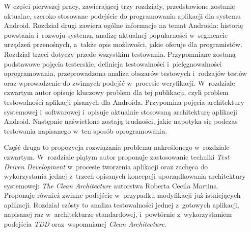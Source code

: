 W części pierwszej pracy, zawierającej trzy rozdziały, przedstawione zostanie aktualne, szeroko stosowane podejście do programowania aplikacji dla systemu Android. Rozdział drugi zawiera ogólne informacje na temat Androida: historię powstania i~rozwoju systemu, analizę aktualnej popularności w~segmencie urządzeń przenośnych, a~także opis możliwości, jakie oferuje dla programistów. Rozdział trzeci dotyczy przede wszystkim testowania. Przypomniane zostaną podstawowe pojęcia testerskie, definicja testowalności i~pielęgnowalności oprogramowania, przeprowadzona analiza obszarów testowych i~rodzajów testów oraz wprowadzenie do zwinnych podejść w~procesie weryfikacji. W~rozdziale czwartym autor opisuje kluczowy problem dla tej publikacji, czyli problem testowalności aplikacji pisanych dla Androida. Przypomina pojęcia architektury systemowej i~softwarowej i~opisuje aktualnie stosowaną architekturę aplikacji Android. Następnie naświetlone zostają trudności, jakie napotyka się podczas testowania napisanego w~ten sposób oprogramowania.

Część druga to propozycja rozwiązania problemu nakreślonego w~rozdziale czwartym. W~rozdziale piątym autor proponuje zastosowanie techniki \textit{Test Driven Development} w~procesie tworzenia aplikacji oraz zachęca do wykorzystania jednej z~trzech opisanych koncepcji uporządkowania architektury systemowej: \textit{The Clean Architecture} autorstwa Roberta Cecila Martina. Proponuje również zwinne podejście w~przypadku modyfikacji już istniejących aplikacji. Rozdział szósty to analiza testowalności jednej z~gotowych aplikacji, napisanej raz w~architekturze standardowej, i~powtórnie z~wykorzystaniem podejścia \textit{TDD} oraz~wspomnianej \textit{Clean Architecture}.



